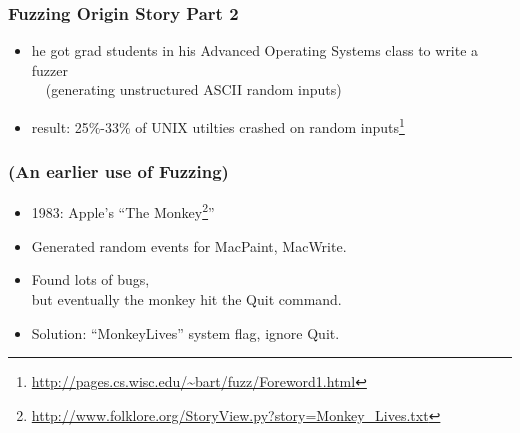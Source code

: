 \documentclass{beamer}
\newenvironment{changemargin}[1]{%
  \begin{list}{}{%
    \setlength{\topsep}{0pt}%
    \setlength{\leftmargin}{#1}%
    \setlength{\rightmargin}{1em}
    \setlength{\listparindent}{\parindent}%
    \setlength{\itemindent}{\parindent}%
    \setlength{\parsep}{\parskip}%
  }%
  \item[]}{\end{list}}
\begin{document}
\begin{frame}[fragile]
  \frametitle{Fuzzing Origin Story Part 2}
  \begin{changemargin}{2em}
    \begin{itemize}
    \item he got grad students in his Advanced Operating Systems class to write a fuzzer\\
      ~~(generating unstructured ASCII random inputs)
    \item result: 25\%-33\% of UNIX utilties
      crashed on random inputs\footnote{\url{http://pages.cs.wisc.edu/~bart/fuzz/Foreword1.html}}
    \end{itemize}
  \end{changemargin}
\end{frame}

\begin{frame}
  \frametitle{(An earlier use of Fuzzing)}
  \begin{changemargin}{2em}
  \begin{itemize}
  \item 1983: Apple's ``The Monkey\footnote{\url{http://www.folklore.org/StoryView.py?story=Monkey_Lives.txt}}''
  \item Generated random events for MacPaint, MacWrite.
  \item Found lots of bugs,\\ but eventually the monkey hit the Quit command.\\[1em]
    \item Solution: ``MonkeyLives'' system flag, ignore Quit.
  \end{itemize}
  \end{changemargin}
\end{frame}
\end{document}
